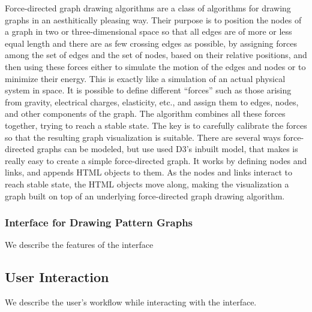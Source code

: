 Force-directed graph drawing algorithms are a class of algorithms for drawing graphs in an aesthitically pleasing way. Their purpose is to position the nodes of a graph in two or three-dimensional space so that all edges are of more or less equal length and there are as few crossing edges as possible, by assigning forces among the set of edges and the set of nodes, based on their relative positions, and then using these forces either to simulate the motion of the edges and nodes or to minimize their energy. This is exactly like a simulation of an actual physical system in space. It is possible to define different ``forces'' such as those arising from gravity, electrical charges, elasticity, etc., and assign them to edges, nodes, and other components of the graph. The algorithm combines all these forces together, trying to reach a stable state. The key is to carefully calibrate the forces so that the resulting graph visualization is suitable. There are several ways force-directed graphs can be modeled, but use used D3's inbuilt model, that makes is really easy to create a simple force-directed graph. It works by defining nodes and links, and appends HTML objects to them. As the nodes and links interact to reach stable state, the HTML objects move along, making the visualization a graph built on top of an underlying force-directed graph drawing algorithm.

\subsubsection{Interface for Drawing Pattern Graphs}
We describe the features of the interface

\subsection{User Interaction}
We describe the user's workflow while interacting with the interface.